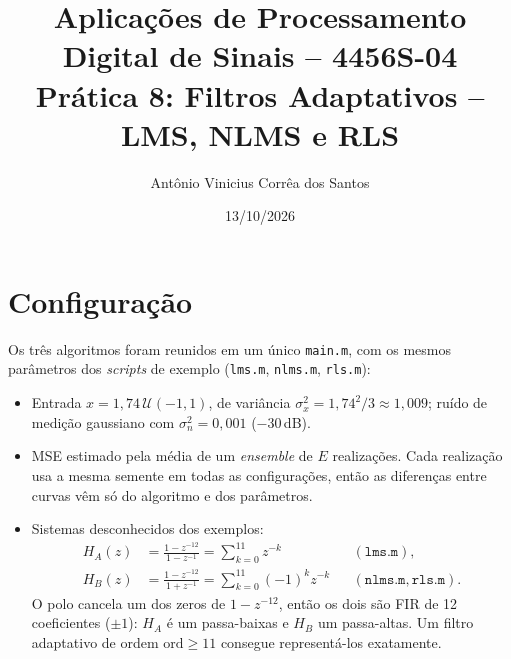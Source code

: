 \documentclass[11pt,a4paper]{article}
\title{Aplicações de Processamento Digital de Sinais -- 4456S-04\\[2mm]
\large Prática 8: Filtros Adaptativos -- LMS, NLMS e RLS}
\author{Antônio Vinicius Corrêa dos Santos}
\date{13/10/2026}
\begin{document}
\maketitle

\section{Configuração}

Os três algoritmos foram reunidos em um único \texttt{main.m}, com os mesmos parâmetros
dos \emph{scripts} de exemplo (\texttt{lms.m}, \texttt{nlms.m}, \texttt{rls.m}):

\begin{itemize}\itemsep0pt
  \item Entrada $x = 1{,}74\,\mathcal{U}(-1,1)$, de variância
        $\sigma_x^2 = 1{,}74^2/3 \approx 1{,}009$; ruído de medição gaussiano com
        $\sigma_n^2 = 0{,}001$ ($-30$\,dB).
  \item MSE estimado pela média de um \emph{ensemble} de $E$ realizações. Cada realização
        usa a mesma semente em todas as configurações, então as diferenças entre curvas
        vêm só do algoritmo e dos parâmetros.
  \item Sistemas desconhecidos dos exemplos:
        \begin{align*}
        H_A(z) &= \frac{1-z^{-12}}{1-z^{-1}} = \sum_{k=0}^{11} z^{-k}
        && (\texttt{lms.m}),\\
        H_B(z) &= \frac{1-z^{-12}}{1+z^{-1}} = \sum_{k=0}^{11} (-1)^k z^{-k}
        && (\texttt{nlms.m}, \texttt{rls.m}).
        \end{align*}
        O polo cancela um dos zeros de $1-z^{-12}$, então os dois são FIR de 12
        coeficientes ($\pm1$): $H_A$ é um passa-baixas e $H_B$ um passa-altas. Um filtro
        adaptativo de ordem $\text{ord}\ge 11$ consegue representá-los exatamente.
\end{itemize}
\end{document}
